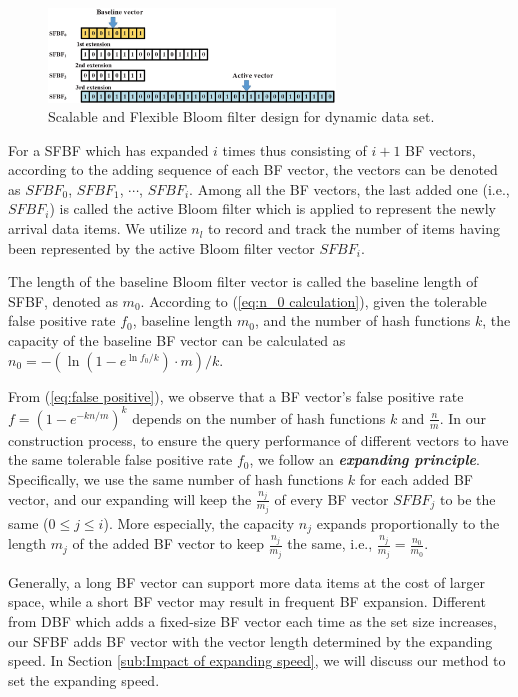 \documentclass[10pt,journal,compsoc]{IEEEtran}
\newcommand{\rev}[1]{#1}
\begin{document}
\begin{figure}[!h]
\centering
\includegraphics[width=3.0in]{fig/sbf}
\caption{ Scalable and Flexible Bloom filter design for dynamic data set.}
\label{fig:Scalable bloom filter design for dynamic MCC}
\end{figure}
For a SFBF which has expanded $i$ times thus consisting of $i+1$ BF vectors, according to the adding sequence of each BF vector, the vectors can be denoted as $SFBF_0$, $SFBF_1$, $\cdots$, $SFBF_i$.
Among all the BF vectors,  the last added one (i.e., $SFBF_i$) is called the active Bloom filter which is applied to represent the newly arrival data items. We  utilize $n_l$ to record and track the number of items having been represented by the active Bloom filter vector $SFBF_i$.%

The length of the baseline Bloom filter vector is called the baseline length of SFBF, denoted as $m_0$. According to (\ref{eq:n_0 calculation}), given the tolerable false positive rate $f_0$, baseline length $m_0$, and the number of hash functions $k$, the capacity of the baseline BF vector can be calculated as ${n_0} =  - \left( {\ln \left( {1 - {e^{\ln {f_0}/k}}} \right) \cdot m} \right)/k$.

From (\ref{eq:false positive}), we observe that a BF vector's false positive rate $f = {\left( {1 - {e^{ - kn/m}}} \right)^k}$ depends on the number of hash functions $k$ and $\frac{n}{m}$. In our construction process, to ensure the query performance of different vectors to have the same tolerable false positive rate $f_0$, we follow an \emph{\textbf{expanding principle}}. Specifically, we use the same number of hash functions $k$ for each added BF vector, and our expanding will keep the $\frac{{{n_j}}}{{{m_j}}}$ of every BF vector $SFBF_j$ to be the same ($0 \le j \le i$). More especially, the capacity $n_j$ expands proportionally to the length $m_j$ of the added BF vector to keep $\frac{n_j}{m_j}$ the same, i.e., $\frac{{{n_j}}}{{{m_j}}} = \frac{{{n_0}}}{{{m_0}}}$.





Generally, a long BF vector can support more data items at the cost of larger space, while a short BF vector may result in frequent BF expansion. Different from DBF \cite{guo2006theory, wei2010mad2} which adds a fixed-size BF vector each time as the set size increases,  our SFBF adds BF vector with the vector length  determined by the expanding speed. \rev{In Section \ref{sub:Impact of expanding speed}, we will discuss our method to set the expanding speed.}
\end{document}
